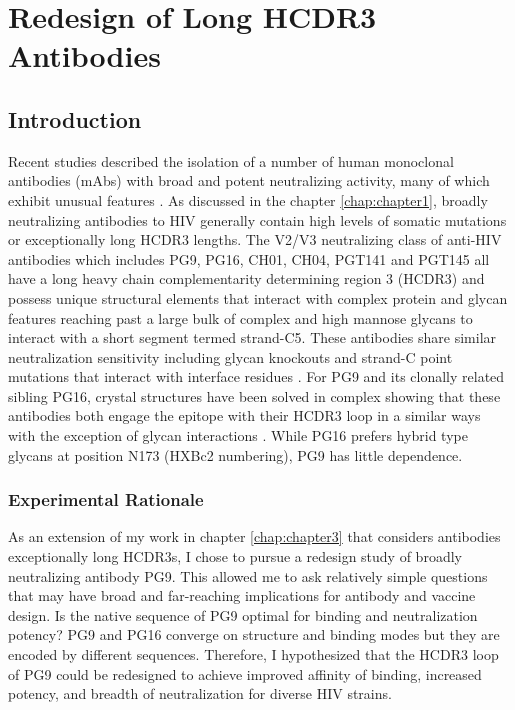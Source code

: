 \chapter{Redesign of Long HCDR3 Antibodies}
\label{chap:chapter4}
\section{Introduction}
Recent studies described the isolation of a number of human monoclonal antibodies (mAbs) with broad and potent neutralizing activity, many of which exhibit unusual features \citep{Bonsignori:2011dq,McLellan:2011dg,Walker:2009cd,Walker:2011ew}. As discussed in the chapter \ref{chap:chapter1}, broadly neutralizing antibodies to HIV generally contain high levels of somatic mutations or exceptionally long HCDR3 lengths. The V2/V3 neutralizing class of anti-HIV antibodies which includes PG9, PG16, CH01, CH04, PGT141 and PGT145 all have a long heavy chain complementarity determining region 3 (HCDR3) and possess unique structural elements that interact with complex protein and glycan features reaching past a large bulk of complex and high mannose glycans to interact with a short segment termed strand-C5. These antibodies share similar neutralization sensitivity including glycan knockouts and strand-C point mutations that interact with interface residues \citep{DoriaRose:2012if,Doores:2010gn}.  For PG9 and its clonally related sibling PG16, crystal structures have been solved in complex showing that these antibodies both engage the epitope with their HCDR3 loop in a similar ways with the exception of glycan interactions \citep{Pancera:2013ev}. While PG16 prefers hybrid type glycans at position N173 (HXBc2 numbering), PG9 has little dependence.

\subsection{Experimental Rationale}
As an extension of my work in chapter \ref{chap:chapter3} that considers antibodies exceptionally long HCDR3s, I chose to pursue a redesign study of broadly neutralizing antibody PG9. This allowed me to ask relatively simple questions that may have broad and far-reaching implications for antibody and vaccine design. Is the native sequence of PG9 optimal for binding and neutralization potency? PG9 and PG16 converge on structure and binding modes but they are encoded by different sequences. Therefore, I hypothesized that the HCDR3 loop of PG9 could be redesigned to achieve improved affinity of binding, increased potency, and breadth of neutralization for diverse HIV strains.


